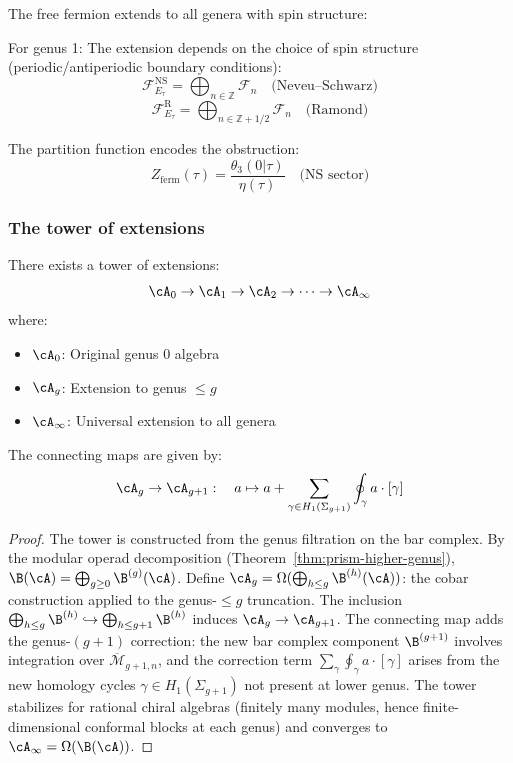 \begin{example}
The free fermion extends to all genera with spin structure:

For genus 1: The extension depends on the choice of spin structure (periodic/antiperiodic boundary conditions):
\[
\mathcal{F}_{E_\tau}^{\text{NS}} = \bigoplus_{n \in \mathbb{Z}} \mathcal{F}_n \quad \text{(Neveu--Schwarz)}
\]
\[
\mathcal{F}_{E_\tau}^{\text{R}} = \bigoplus_{n \in \mathbb{Z} + 1/2} \mathcal{F}_n \quad \text{(Ramond)}
\]

The partition function encodes the obstruction:
\[
Z_{\text{ferm}}(\tau) = \frac{\theta_3(0|\tau)}{\eta(\tau)} \quad \text{(NS sector)}
\]
\end{example}

\subsubsection{The tower of extensions}

\begin{theorem}\label{thm:universal-extension-tower}
There exists a tower of extensions:
\[
\cA_0 \to \cA_1 \to \cA_2 \to \cdots \to \cA_\infty
\]
where:
\begin{itemize}
\item $\cA_0$: Original genus 0 algebra
\item $\cA_g$: Extension to genus $\leq g$
\item $\cA_\infty$: Universal extension to all genera
\end{itemize}

The connecting maps are given by:
\[
\cA_g \to \cA_{g+1}: \quad a \mapsto a + \sum_{\gamma \in H_1(\Sigma_{g+1})} \oint_\gamma a \cdot [\gamma]
\]
\end{theorem}

\begin{proof}
The tower is constructed from the genus filtration on the bar complex.  By the modular operad decomposition (Theorem~\ref{thm:prism-higher-genus}), $\B(\cA) = \bigoplus_{g \geq 0} \B^{(g)}(\cA)$.  Define $\cA_g = \Omega(\bigoplus_{h \leq g} \B^{(h)}(\cA))$: the cobar construction applied to the genus-$\leq g$ truncation.  The inclusion $\bigoplus_{h \leq g} \B^{(h)} \hookrightarrow \bigoplus_{h \leq g+1} \B^{(h)}$ induces $\cA_g \to \cA_{g+1}$.  The connecting map adds the genus-$(g+1)$ correction: the new bar complex component $\B^{(g+1)}$ involves integration over $\overline{\mathcal{M}}_{g+1,n}$, and the correction term $\sum_\gamma \oint_\gamma a \cdot [\gamma]$ arises from the new homology cycles $\gamma \in H_1(\Sigma_{g+1})$ not present at lower genus.  The tower stabilizes for rational chiral algebras (finitely many modules, hence finite-dimensional conformal blocks at each genus) and converges to $\cA_\infty = \Omega(\B(\cA))$.
\end{proof}

